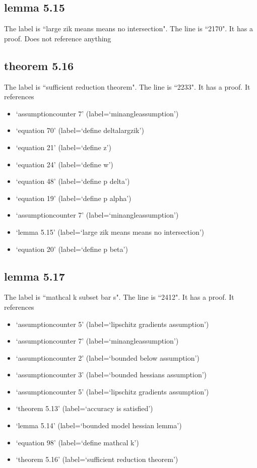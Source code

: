 \documentclass{article}
\begin{document}
\subsection{lemma 5.15}
The label is ``large zik means means no intersection".
The line is ``2170".
It has a proof.
Does not reference anything
\subsection{theorem 5.16}
The label is ``sufficient reduction theorem".
The line is ``2233".
It has a proof.
It references \begin{itemize}
\item `assumptioncounter 7' (label=`minangleassumption')
\item `equation 70' (label=`define deltalargzik')
\item `equation 21' (label=`define z')
\item `equation 24' (label=`define w')
\item `equation 48' (label=`define p delta')
\item `equation 19' (label=`define p alpha')
\item `assumptioncounter 7' (label=`minangleassumption')
\item `lemma 5.15' (label=`large zik means means no intersection')
\item `equation 20' (label=`define p beta')
\end{itemize}
\subsection{lemma 5.17}
The label is ``mathcal k subset bar s".
The line is ``2412".
It has a proof.
It references \begin{itemize}
\item `assumptioncounter 5' (label=`lipschitz gradients assumption')
\item `assumptioncounter 7' (label=`minangleassumption')
\item `assumptioncounter 2' (label=`bounded below assumption')
\item `assumptioncounter 3' (label=`bounded hessians assumption')
\item `assumptioncounter 5' (label=`lipschitz gradients assumption')
\item `theorem 5.13' (label=`accuracy is satisfied')
\item `lemma 5.14' (label=`bounded model hessian lemma')
\item `equation 98' (label=`define mathcal k')
\item `theorem 5.16' (label=`sufficient reduction theorem')
\end{itemize}
\end{document}
